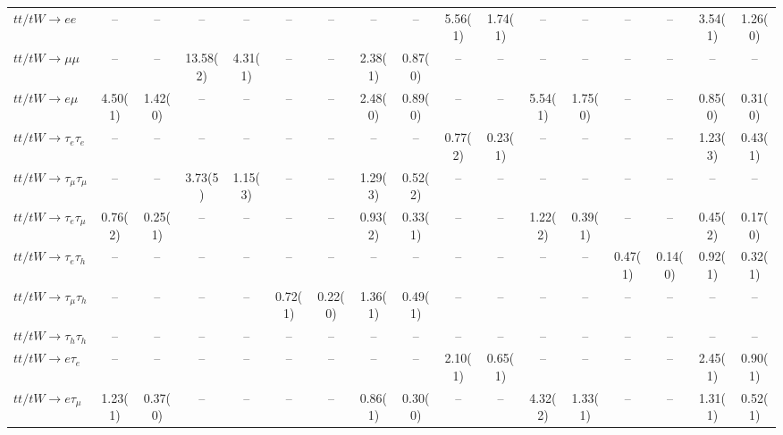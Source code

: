 \begin{sidewaystable}[p]
\begin{tabular}{|l|cc|cc|cc|cc|cc|cc|cc|cc|}
    $tt/tW \to ee$                     &    --    &    --    &    --    &    --    &    --    &    --    &    --    &    --    &  5.56(1) &  1.74(1) &    --    &    --    &    --    &    --    &  3.54(1) &  1.26(0) \\ 
    $tt/tW \to \mu\mu$                 &    --    &    --    & 13.58(2) &  4.31(1) &    --    &    --    &  2.38(1) &  0.87(0) &    --    &    --    &    --    &    --    &    --    &    --    &    --    &    --    \\ 
    $tt/tW \to e\mu$                   &  4.50(1) &  1.42(0) &    --    &    --    &    --    &    --    &  2.48(0) &  0.89(0) &    --    &    --    &  5.54(1) &  1.75(0) &    --    &    --    &  0.85(0) &  0.31(0) \\ 
    $tt/tW \to \tau_{e}\tau_{e}$       &    --    &    --    &    --    &    --    &    --    &    --    &    --    &    --    &  0.77(2) &  0.23(1) &    --    &    --    &    --    &    --    &  1.23(3) &  0.43(1) \\ 
    $tt/tW \to \tau_{\mu}\tau_{\mu}$   &    --    &    --    &  3.73(5) &  1.15(3) &    --    &    --    &  1.29(3) &  0.52(2) &    --    &    --    &    --    &    --    &    --    &    --    &    --    &    --    \\ 
    $tt/tW \to \tau_{e}\tau_{\mu}$     &  0.76(2) &  0.25(1) &    --    &    --    &    --    &    --    &  0.93(2) &  0.33(1) &    --    &    --    &  1.22(2) &  0.39(1) &    --    &    --    &  0.45(2) &  0.17(0) \\ 
    $tt/tW \to \tau_{e}\tau_{h}$       &    --    &    --    &    --    &    --    &    --    &    --    &    --    &    --    &    --    &    --    &    --    &    --    &  0.47(1) &  0.14(0) &  0.92(1) &  0.32(1) \\ 
    $tt/tW \to \tau_{\mu}\tau_{h}$     &    --    &    --    &    --    &    --    &  0.72(1) &  0.22(0) &  1.36(1) &  0.49(1) &    --    &    --    &    --    &    --    &    --    &    --    &    --    &    --    \\ 
    $tt/tW \to \tau_{h}\tau_{h}$       &    --    &    --    &    --    &    --    &    --    &    --    &    --    &    --    &    --    &    --    &    --    &    --    &    --    &    --    &    --    &    --    \\ 
    $tt/tW \to e\tau_{e}$              &    --    &    --    &    --    &    --    &    --    &    --    &    --    &    --    &  2.10(1) &  0.65(1) &    --    &    --    &    --    &    --    &  2.45(1) &  0.90(1) \\ 
    $tt/tW \to e\tau_{\mu}$            &  1.23(1) &  0.37(0) &    --    &    --    &    --    &    --    &  0.86(1) &  0.30(0) &    --    &    --    &  4.32(2) &  1.33(1) &    --    &    --    &  1.31(1) &  0.52(1) \\ 

\end{tabular}
\end{sidewaystable}
